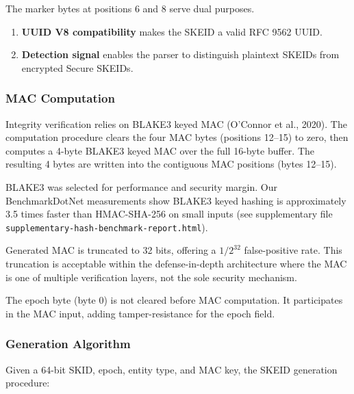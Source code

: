 \documentclass[fleqn,10pt]{wlpeerj}
\providecommand{\tightlist}{%
  \setlength{\itemsep}{0pt}\setlength{\parskip}{0pt}}
\begin{document}
The marker bytes at positions 6 and 8 serve dual purposes.

\begin{enumerate}
\def\labelenumi{\arabic{enumi}.}
\tightlist
\item
  \textbf{UUID V8 compatibility} makes the SKEID a valid RFC 9562 UUID.
\item
  \textbf{Detection signal} enables the parser to distinguish plaintext
  SKEIDs from encrypted Secure SKEIDs.
\end{enumerate}

\subsubsection{MAC Computation}\label{mac-computation}

Integrity verification relies on BLAKE3 keyed MAC (O'Connor et al.,
2020). The computation procedure clears the four MAC bytes (positions
12--15) to zero, then computes a 4-byte BLAKE3 keyed MAC over the full
16-byte buffer. The resulting 4 bytes are written into the contiguous
MAC positions (bytes 12--15).

BLAKE3 was selected for performance and security margin. Our
BenchmarkDotNet measurements show BLAKE3 keyed hashing is approximately
3.5 times faster than HMAC-SHA-256 on small inputs (see supplementary
file \texttt{supplementary-hash-benchmark-report.html}).

Generated MAC is truncated to 32 bits, offering a \(1/2^{32}\)
false-positive rate. This truncation is acceptable within the
defense-in-depth architecture where the MAC is one of multiple
verification layers, not the sole security mechanism.

The epoch byte (byte 0) is not cleared before MAC computation. It
participates in the MAC input, adding tamper-resistance for the epoch
field.

\newpage

\subsubsection{Generation Algorithm}\label{generation-algorithm-1}

Given a 64-bit SKID, epoch, entity type, and MAC key, the SKEID
generation procedure:
\end{document}
